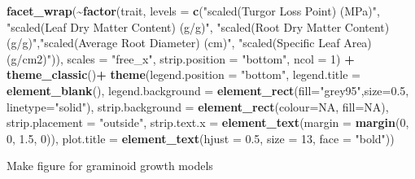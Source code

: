 \documentclass[
]{article}
\newenvironment{Shaded}{\begin{snugshade}}{\end{snugshade}}
\newcommand{\DataTypeTok}[1]{\textcolor[rgb]{0.13,0.29,0.53}{#1}}
\newcommand{\DecValTok}[1]{\textcolor[rgb]{0.00,0.00,0.81}{#1}}
\newcommand{\FloatTok}[1]{\textcolor[rgb]{0.00,0.00,0.81}{#1}}
\newcommand{\KeywordTok}[1]{\textcolor[rgb]{0.13,0.29,0.53}{\textbf{#1}}}
\newcommand{\NormalTok}[1]{#1}
\newcommand{\OperatorTok}[1]{\textcolor[rgb]{0.81,0.36,0.00}{\textbf{#1}}}
\newcommand{\OtherTok}[1]{\textcolor[rgb]{0.56,0.35,0.01}{#1}}
\newcommand{\StringTok}[1]{\textcolor[rgb]{0.31,0.60,0.02}{#1}}
\begin{document}
\begin{Shaded}
\begin{Highlighting}[]
\StringTok{  }\KeywordTok{facet\_wrap}\NormalTok{(}\OperatorTok{\textasciitilde{}}\KeywordTok{factor}\NormalTok{(trait, }\DataTypeTok{levels =} \KeywordTok{c}\NormalTok{(}\StringTok{"scaled(Turgor Loss Point) (MPa)"}\NormalTok{, }\StringTok{"scaled(Leaf Dry Matter Content) (g/g)"}\NormalTok{, }\StringTok{"scaled(Root Dry Matter Content) (g/g)"}\NormalTok{,}\StringTok{"scaled(Average Root Diameter) (cm)"}\NormalTok{, }\StringTok{"scaled(Specific Leaf Area) (g/cm2)"}\NormalTok{)), }\DataTypeTok{scales =} \StringTok{"free\_x"}\NormalTok{, }\DataTypeTok{strip.position =}  \StringTok{"bottom"}\NormalTok{, }\DataTypeTok{ncol =} \DecValTok{1}\NormalTok{) }\OperatorTok{+}
\StringTok{  }\KeywordTok{theme\_classic}\NormalTok{()}\OperatorTok{+}
\StringTok{  }\KeywordTok{theme}\NormalTok{(}\DataTypeTok{legend.position =} \StringTok{"bottom"}\NormalTok{, }\DataTypeTok{legend.title =} \KeywordTok{element\_blank}\NormalTok{(), }\DataTypeTok{legend.background =} \KeywordTok{element\_rect}\NormalTok{(}\DataTypeTok{fill=}\StringTok{"grey95"}\NormalTok{,}\DataTypeTok{size=}\FloatTok{0.5}\NormalTok{, }\DataTypeTok{linetype=}\StringTok{"solid"}\NormalTok{), }\DataTypeTok{strip.background =} \KeywordTok{element\_rect}\NormalTok{(}\DataTypeTok{colour=}\OtherTok{NA}\NormalTok{, }\DataTypeTok{fill=}\OtherTok{NA}\NormalTok{), }\DataTypeTok{strip.placement =} \StringTok{"outside"}\NormalTok{, }\DataTypeTok{strip.text.x =} \KeywordTok{element\_text}\NormalTok{(}\DataTypeTok{margin =} \KeywordTok{margin}\NormalTok{(}\DecValTok{0}\NormalTok{, }\DecValTok{0}\NormalTok{, }\FloatTok{1.5}\NormalTok{, }\DecValTok{0}\NormalTok{)), }\DataTypeTok{plot.title =} \KeywordTok{element\_text}\NormalTok{(}\DataTypeTok{hjust =} \FloatTok{0.5}\NormalTok{, }\DataTypeTok{size =} \DecValTok{13}\NormalTok{, }\DataTypeTok{face =} \StringTok{"bold"}\NormalTok{))}
\end{Highlighting}
\end{Shaded}

Make figure for graminoid growth models
\end{document}
